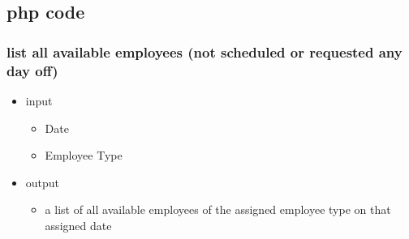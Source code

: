 \documentclass[11pt]{article}
\providecommand{\tightlist}{%
      \setlength{\itemsep}{0pt}\setlength{\parskip}{0pt}}
\begin{document}
    \subsection*{php code}\label{php-code}

    \subsubsection*{list all available employees (not scheduled or requested
any day
off)}\label{list-all-available-employees-not-scheduled-or-requested-any-day-off}

\begin{itemize}
\tightlist
\item
  input

  \begin{itemize}
  \tightlist
  \item
    Date
  \item
    Employee Type
  \end{itemize}
\item
  output

  \begin{itemize}
  \tightlist
  \item
    a list of all available employees of the assigned employee type on
    that assigned date
  \end{itemize}
\end{itemize}
\end{document}
